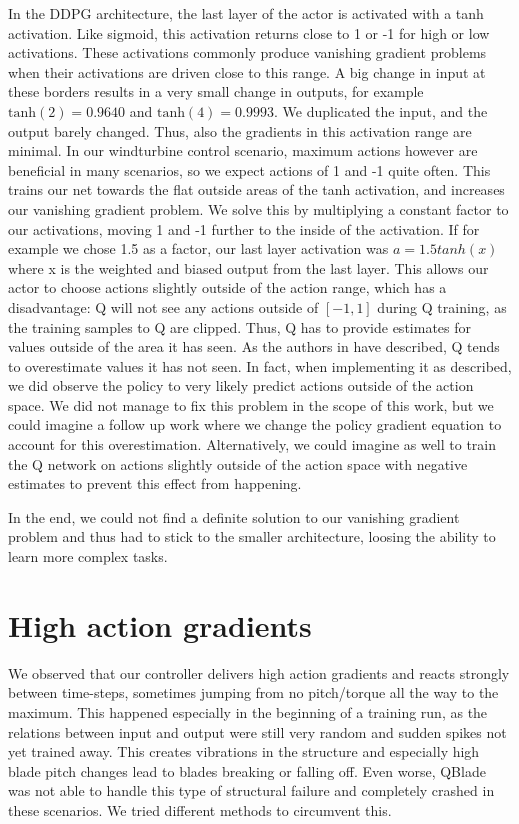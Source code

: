 \documentclass[hyperref,final,beleg]{cgvpub}
\begin{document}
In the \ac{DDPG} architecture, the last layer of the actor is activated with a tanh activation. Like sigmoid, this activation returns close to 1 or -1 for high or low activations. These activations commonly produce vanishing gradient problems when their activations are driven close to this range. A big change in input at these borders results in a very small change in outputs, for example $\text{tanh}(2)=0.9640$ and $\text{tanh}(4)=0.9993$. We duplicated the input, and the output barely changed. Thus, also the gradients in this activation range are minimal. In our windturbine control scenario, maximum actions however are beneficial in many scenarios, so we expect actions of 1 and -1 quite often. This trains our net towards the flat outside areas of the tanh activation, and increases our vanishing gradient problem. We solve this by multiplying a constant factor to our activations, moving 1 and -1 further to the inside of the activation. If for example we chose 1.5 as a factor, our last layer activation was $a = 1.5tanh(x)$ where x is the weighted and biased output from the last layer. This allows our actor to choose actions slightly outside of the action range, which has a disadvantage: Q will not see any actions outside of $[-1, 1]$ during Q training, as the training samples to Q are clipped. Thus, Q has to provide estimates for values outside of the area it has seen. As the authors in \cite{fujimotoOffPolicyDeepReinforcement2019} have described, Q tends to overestimate values it has not seen. In fact, when implementing it as described, we did observe the policy to very likely predict actions outside of the action space. We did not manage to fix this problem in the scope of this work, but we could imagine a follow up work where we change the policy gradient equation to account for this overestimation. Alternatively, we could imagine as well to train the Q network on actions slightly outside of the action space with negative estimates to prevent this effect from happening.

In the end, we could not find a definite solution to our vanishing gradient problem and thus had to stick to the smaller architecture, loosing the ability to learn more complex tasks.

\section{High action gradients}

We observed that our controller delivers high action gradients and reacts strongly between time-steps, sometimes jumping from no pitch/torque all the way to the maximum. This happened especially in the beginning of a training run, as the relations between input and output were still very random and sudden spikes not yet trained away. This creates vibrations in the structure and especially high blade pitch changes lead to blades breaking or falling off. Even worse, QBlade was not able to handle this type of structural failure and completely crashed in these scenarios. We tried different methods to circumvent this.
\end{document}

